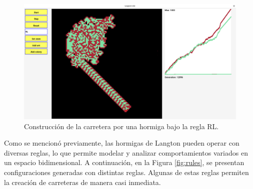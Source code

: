 \documentclass[12pt,twoside]{article}
\begin{document}
\begin{figure}[H]
	\centering
	\includegraphics[width=\textwidth]{img/rl2.png}
	\caption{Construcción de la carretera por una hormiga bajo la regla RL.}
	\label{img:rl2}
\end{figure}

Como se mencionó previamente, las hormigas de Langton pueden operar con diversas reglas, lo que permite modelar y analizar comportamientos variados en un espacio bidimensional. A continuación, en la Figura \ref{fig:rules}, se presentan configuraciones generadas con distintas reglas. Algunas de estas reglas permiten la creación de carreteras de manera casi inmediata.
\end{document}
